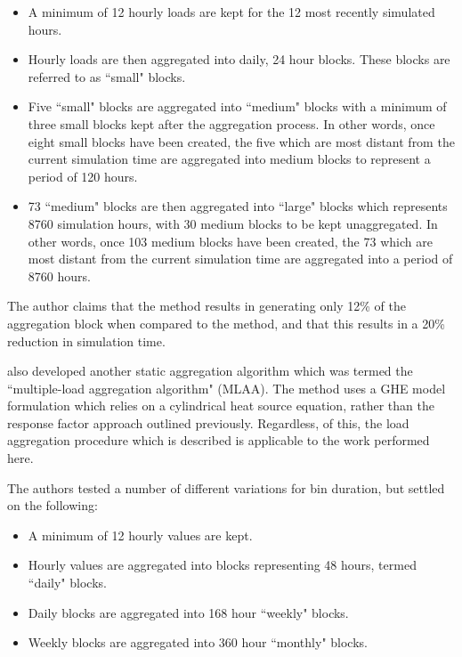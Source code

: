 \documentclass[review,12pt]{elsarticle}
\begin{document}
\begin{itemize}
    \item A minimum of 12 hourly loads are kept for the 12 most recently simulated hours.

    \item Hourly loads are then aggregated into daily, 24 hour blocks. These blocks are referred to as ``small" blocks.

    \item Five ``small" blocks are aggregated into ``medium" blocks with a minimum of three small blocks kept after the aggregation process. In other words, once eight small blocks have been created, the five which are most distant from the current simulation time are aggregated into medium blocks to represent a period of 120 hours.
    
    \item 73 ``medium" blocks are then aggregated into ``large" blocks which represents 8760 simulation hours, with 30 medium blocks to be kept unaggregated. In other words, once 103 medium blocks have been created, the 73 which are most distant from the current simulation time are aggregated into a period of 8760 hours.
    
\end{itemize} 

The author claims that the method results in generating only 12\% of the aggregation block when compared to the \cite{YavuzturkSpitler1999} method, and that this results in a 20\% reduction in simulation time.

\cite{BernierPinelLabibPaillot2004} also developed another static aggregation algorithm which was termed the ``multiple-load aggregation algorithm" (MLAA). The method uses a GHE model formulation which relies on a cylindrical heat source equation, rather than the response factor approach outlined previously. Regardless, of this, the load aggregation procedure which is described is applicable to the work performed here.

The authors tested a number of different variations for bin duration, but settled on the following:

\begin{itemize}
    \item A minimum of 12 hourly values are kept.
    
    \item Hourly values are aggregated into blocks representing 48 hours, termed ``daily" blocks.

    \item Daily blocks are aggregated into 168 hour ``weekly" blocks.
    
    \item Weekly blocks are aggregated into 360 hour ``monthly" blocks.

\end{itemize}
\end{document}
